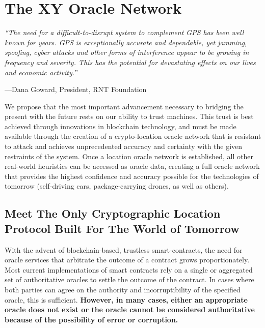 \documentclass{article}
\begin{document}
\section {The XY Oracle Network}

\begin{displayquote}\textit{``The need for a difficult-to-disrupt system to complement GPS has been well known for years. GPS is exceptionally accurate and dependable, yet jamming, spoofing, cyber attacks and other forms of interference appear to be growing in frequency and severity. This has the potential for devastating effects on our lives and economic activity.''}

\vspace{2mm}
---Dana Goward, President, RNT Foundation
\end{displayquote}

We propose that the most important advancement necessary to bridging the present with the future rests on our ability to trust machines. This trust is best achieved through innovations in blockchain technology, and must be made available through the creation of a crypto-location \gls{oracle} network that is resistant to attack and achieves unprecedented \gls{accuracy} and \gls{certainty} with the given restraints of the system. Once a location oracle network is established, all other real-world \glspl{heuristic} can be accessed as oracle data, creating a full oracle network that provides the highest confidence and accuracy possible for the technologies of tomorrow (self-driving cars, package-carrying drones, as well as others).

\subsection {Meet The Only Cryptographic Location Protocol Built For The World of Tomorrow}
With the advent of blockchain-based, trustless \glspl{smart-contract}, the need for \gls{oracle} services that arbitrate the outcome of a contract grows proportionately. Most current implementations of smart contracts rely on a single or aggregated set of authoritative oracles to settle the outcome of the contract. In cases where both parties can agree on the authority and incorruptibility of the specified oracle, this is sufficient. \textbf{However, in many cases, either an appropriate oracle does not exist or the oracle cannot be considered authoritative because of the possibility of error or corruption.}
\end{document}
